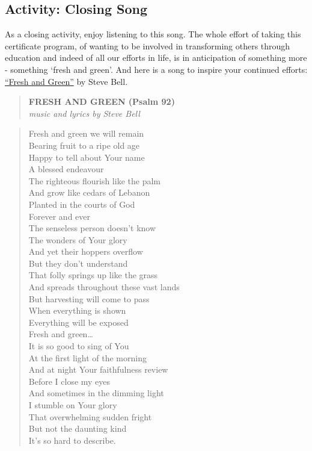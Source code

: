\documentclass[
]{book}
\begin{document}
\hypertarget{activity-closing-song}{%
\subsection*{Activity: Closing Song}\label{activity-closing-song}}

\begin{reflect}
As a closing activity, enjoy listening to this song. The whole effort of
taking this certificate program, of wanting to be involved in
transforming others through education and indeed of all our efforts in
life, is in anticipation of something more - something `fresh and
green'. And here is a song to inspire your continued efforts:
\href{https://www.youtube.com/watch?v=uKjVQ5VSaXc}{``Fresh and Green''}
by Steve Bell.

\begin{quote}
\textbf{FRESH AND GREEN (Psalm 92)}\\
\emph{music and lyrics by Steve Bell}
\end{quote}

\begin{quote}
Fresh and green we will remain\\
Bearing fruit to a ripe old age\\
Happy to tell about Your name\\
A blessed endeavour\\
The righteous flourish like the palm\\
And grow like cedars of Lebanon\\
Planted in the courts of God\\
Forever and ever\\
The senseless person doesn't know\\
The wonders of Your glory\\
And yet their hoppers overflow\\
But they don't understand\\
That folly springs up like the grass\\
And spreads throughout these vast lands\\
But harvesting will come to pass\\
When everything is shown\\
Everything will be exposed\\
Fresh and green\ldots{}\\
It is so good to sing of You\\
At the first light of the morning\\
And at night Your faithfulness review\\
Before I close my eyes\\
And sometimes in the dimming light\\
I stumble on Your glory\\
That overwhelming sudden fright\\
But not the daunting kind\\
It's so hard to describe.
\end{quote}
\end{reflect}
\end{document}
